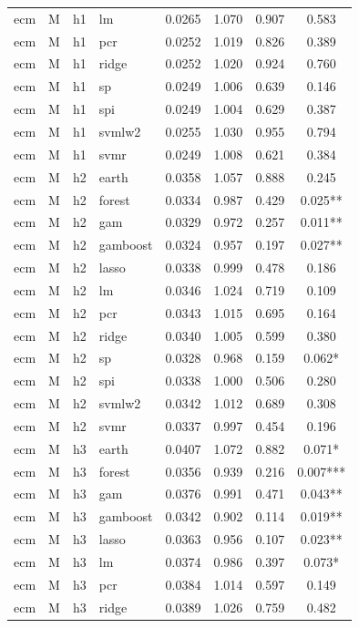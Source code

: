 \begin{ThreePartTable}
\begin{longtable}[t]{llclcccc}
ecm & M & h1 & lm & 0.0265 & 1.070 & 0.907 & 0.583\\
ecm & M & h1 & pcr & 0.0252 & 1.019 & 0.826 & 0.389\\
ecm & M & h1 & ridge & 0.0252 & 1.020 & 0.924 & 0.760\\
ecm & M & h1 & sp & 0.0249 & 1.006 & 0.639 & 0.146\\
ecm & M & h1 & spi & 0.0249 & 1.004 & 0.629 & 0.387\\
ecm & M & h1 & svmlw2 & 0.0255 & 1.030 & 0.955 & 0.794\\
ecm & M & h1 & svmr & 0.0249 & 1.008 & 0.621 & 0.384\\
\addlinespace
ecm & M & h2 & earth & 0.0358 & 1.057 & 0.888 & 0.245\\
ecm & M & h2 & forest & 0.0334 & 0.987 & 0.429 & 0.025**\\
ecm & M & h2 & gam & 0.0329 & 0.972 & 0.257 & 0.011**\\
ecm & M & h2 & gamboost & 0.0324 & 0.957 & 0.197 & 0.027**\\
ecm & M & h2 & lasso & 0.0338 & 0.999 & 0.478 & 0.186\\
ecm & M & h2 & lm & 0.0346 & 1.024 & 0.719 & 0.109\\
ecm & M & h2 & pcr & 0.0343 & 1.015 & 0.695 & 0.164\\
ecm & M & h2 & ridge & 0.0340 & 1.005 & 0.599 & 0.380\\
ecm & M & h2 & sp & 0.0328 & 0.968 & 0.159 & 0.062*\\
ecm & M & h2 & spi & 0.0338 & 1.000 & 0.506 & 0.280\\
ecm & M & h2 & svmlw2 & 0.0342 & 1.012 & 0.689 & 0.308\\
ecm & M & h2 & svmr & 0.0337 & 0.997 & 0.454 & 0.196\\
\addlinespace
ecm & M & h3 & earth & 0.0407 & 1.072 & 0.882 & 0.071*\\
ecm & M & h3 & forest & 0.0356 & 0.939 & 0.216 & 0.007***\\
ecm & M & h3 & gam & 0.0376 & 0.991 & 0.471 & 0.043**\\
ecm & M & h3 & gamboost & 0.0342 & 0.902 & 0.114 & 0.019**\\
ecm & M & h3 & lasso & 0.0363 & 0.956 & 0.107 & 0.023**\\
ecm & M & h3 & lm & 0.0374 & 0.986 & 0.397 & 0.073*\\
ecm & M & h3 & pcr & 0.0384 & 1.014 & 0.597 & 0.149\\
ecm & M & h3 & ridge & 0.0389 & 1.026 & 0.759 & 0.482\\

\end{longtable}
\end{ThreePartTable}
